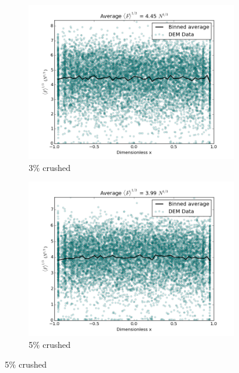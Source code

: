 \begin{figure}[!ht]
    \begin{subfigure}[b]{0.4\textwidth}
        \centering
        \includegraphics[width=\textwidth]{figures/heating_dte-02/3/dump/force-profile.png}
        \caption{3\% crushed}
    \end{subfigure}
    \begin{subfigure}[b]{0.4\textwidth}
        \centering
        \includegraphics[width=\textwidth]{figures/heating_dte-02/5/dump/force-profile.png}
        \caption{5\% crushed}
    \end{subfigure}


\end{figure}
